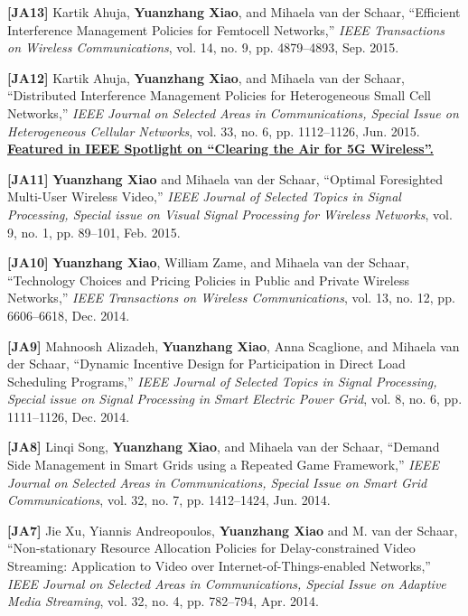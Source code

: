 \documentclass[margin,line]{res}
\begin{document}
\begin{resume}
\textbf{[JA13]} Kartik Ahuja, {\bf Yuanzhang Xiao}, and Mihaela van der Schaar, ``Efficient Interference Management Policies for Femtocell Networks,'' \emph{IEEE Transactions on Wireless Communications}, vol. 14, no. 9, pp. 4879--4893, Sep. 2015.

\textbf{[JA12]} Kartik Ahuja, {\bf Yuanzhang Xiao}, and Mihaela van der Schaar, ``Distributed Interference Management Policies for Heterogeneous Small Cell Networks,'' \emph{IEEE Journal on Selected Areas in Communications, Special Issue on Heterogeneous Cellular Networks}, vol. 33, no. 6, pp. 1112--1126, Jun. 2015. 
\href{http://ieeexplore-spotlight.ieee.org/article/clearing-the-air-for-5g-wireless/?utm_source=Xplore&utm_medium=referreral&utm_content=clearair5g&utm_campaign=xplorehighlight}{\textbf{Featured in IEEE Spotlight on ``Clearing the Air for 5G Wireless''.}}

\textbf{[JA11]} {\bf Yuanzhang Xiao} and Mihaela van der Schaar, ``Optimal Foresighted Multi-User Wireless Video,'' \emph{IEEE Journal of Selected Topics in Signal Processing, Special issue on Visual Signal Processing for Wireless Networks}, vol. 9, no. 1, pp. 89--101, Feb. 2015. 

\textbf{[JA10]} {\bf Yuanzhang Xiao}, William Zame, and Mihaela van der Schaar, ``Technology Choices and Pricing Policies in Public and Private Wireless Networks,''  {\em IEEE Transactions on Wireless Communications}, vol. 13, no. 12, pp. 6606--6618, Dec. 2014.

\textbf{[JA9]} Mahnoosh Alizadeh, {\bf Yuanzhang Xiao}, Anna Scaglione, and Mihaela van der Schaar, ``Dynamic Incentive Design for Participation in Direct Load Scheduling Programs,'' \emph{IEEE Journal of Selected Topics in Signal Processing, Special issue on Signal Processing in Smart Electric Power Grid}, vol. 8, no. 6, pp. 1111--1126, Dec. 2014.

\textbf{[JA8]} Linqi Song, {\bf Yuanzhang Xiao}, and Mihaela van der Schaar, ``Demand Side Management in Smart Grids using a Repeated Game Framework,''
\emph{IEEE Journal on Selected Areas in Communications, Special Issue on Smart Grid Communications}, vol. 32, no. 7, pp. 1412--1424, Jun. 2014.

\textbf{[JA7]} Jie Xu, Yiannis Andreopoulos, {\bf Yuanzhang Xiao} and M. van der Schaar, ``Non-stationary Resource Allocation Policies for Delay-constrained Video Streaming: Application to Video over Internet-of-Things-enabled Networks,'' \emph{IEEE Journal on Selected Areas in Communications, Special Issue on Adaptive Media Streaming}, vol. 32, no. 4, pp. 782--794, Apr. 2014.


\end{resume}
\end{document}
